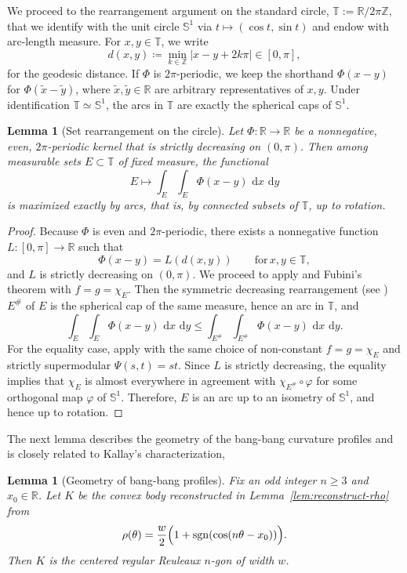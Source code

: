 \documentclass[11pt,letterpaper,reqno]{amsart}
\newcommand{\R}{\mathbb{R}}
\newcommand{\dd}{\,\mathrm{d}}
\newtheorem{lemma}[theorem]{Lemma}
\providecommand{\R}{\mathbb{R}}
\begin{document}
We proceed to the rearrangement argument on the standard circle,
$
\mathbb T:= \mathbb R/2\pi\mathbb Z,
$
that we identify with the unit circle $\mathbb{S}^1$ via $t\mapsto (\cos t,\sin t)$ and endow with arc-length measure. For $x,y\in\mathbb T$, we write
\[
d(x,y)\coloneqq \min_{k\in\mathbb Z}|x-y+2k\pi|\in[0,\pi],
\]
for the geodesic distance. If $\Phi$ is $2\pi$-periodic, we keep the shorthand $\Phi(x-y)$ for $\Phi(\tilde x-\tilde y)$, where $\tilde x,\tilde y\in\mathbb R$ are arbitrary representatives of $x,y$.
Under identification $\mathbb T\simeq \mathbb S^1$, the arcs in $\mathbb T$ are exactly the spherical caps of $\mathbb S^1$.

\begin{lemma}[Set rearrangement on the circle]
\label{lem:circle-rearrangement}
Let $\Phi:\mathbb R\to\mathbb R$ be a nonnegative, even, $2\pi$-periodic kernel that is strictly decreasing on $(0,\pi)$. Then among measurable sets $E\subset\mathbb T$ of fixed measure, the functional
\[
E\longmapsto \int_E\int_E \Phi(x-y)\,\dd x\,\dd y
\]
is maximized exactly by arcs, that is, by connected subsets of $\mathbb T$, up to rotation.
\end{lemma}


\begin{proof}
Because $\Phi$ is even and $2\pi$-periodic, there exists a nonnegative function $L:[0,\pi]\to\mathbb R$ such that
\[
\Phi(x-y)=L(d(x,y))
\qquad \text{for} \, x,y\in\mathbb T,
\]
and $L$ is strictly decreasing on $(0,\pi)$. 
We proceed to 
apply \cite[Corollary 7.1]{Baernstein2019} and Fubini's theorem with
\(
f=g=\chi_E.
\)
Then the symmetric decreasing rearrangement (see \cite{Bur}) $E^{\#}$ of $E$ is the spherical cap of the same measure, hence an arc in $\mathbb T$, and
\[
\int_E\int_E \Phi(x-y)\,\dd x\,\dd y
\le
\int_{E^{\#}}\int_{E^{\#}} \Phi(x-y)\,\dd x\,\dd y.
\]
For the equality case, apply \cite[Theorem 7.3(b)]{Baernstein2019} with the same choice of non-constant $f=g=\chi_E$ and strictly supermodular $\Psi(s,t)=st$. 
Since $L$ is strictly decreasing, the equality implies that $\chi_E$ is almost everywhere in agreement with $\chi_{E^{\#}}\circ \varphi$ for some orthogonal map $\varphi$ of $\mathbb S^1$. Therefore, $E$ is an arc up to an isometry of $\mathbb S^1$, and hence up to rotation.
\end{proof}



The next lemma describes the geometry of the bang-bang curvature profiles and is closely related to Kallay’s characterization, \cite{Kallay}
\begin{lemma}[Geometry of bang-bang profiles]
\label{lem:bang-bang-geometry}
Fix an odd integer $n\ge3$ and $x_0\in\R$. Let $K$ be the convex body reconstructed in Lemma~\ref{lem:reconstruct-rho} from
\[
\rho(\theta)=\frac w2\Bigl(1+\operatorname{sgn}(\cos(n\theta-x_0))\Bigr).
\]
Then $K$ is the centered regular Reuleaux $n$-gon of width $w$.
\end{lemma}
\end{document}
